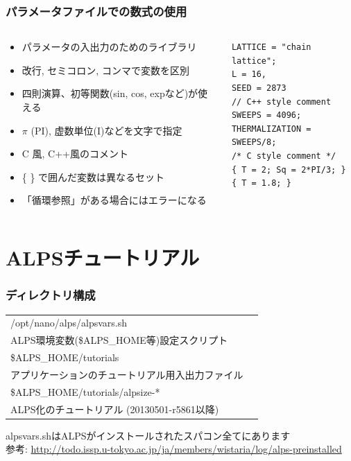 \begin{frame}[t,fragile]
  \frametitle{パラメータファイルでの数式の使用}
  \begin{columns}[T]
    \begin{column}{.5\textwidth}
      \begin{itemize}
      \item パラメータの入出力のためのライブラリ
        \item 改行, セミコロン, コンマで変数を区別
        \item 四則演算、初等関数(sin, cos, expなど)が使える
        \item $\pi$ (PI), 虚数単位(I)などを文字で指定
        \item C 風, C++風のコメント
        \item \{ \} で囲んだ変数は異なるセット
        \item 「循環参照」がある場合にはエラーになる
      \end{itemize}
    \end{column}
    \begin{column}{.5\textwidth}
    \begin{lstlisting}
LATTICE = "chain lattice";
L = 16,
SEED = 2873
// C++ style comment
SWEEPS = 4096;
THERMALIZATION = SWEEPS/8;
/* C style comment */
{ T = 2; Sq = 2*PI/3; }
{ T = 1.8; }
    \end{lstlisting}
    \end{column}
  \end{columns}
\end{frame}

\section{ALPSチュートリアル}

\begin{frame}
  \frametitle{ディレクトリ構成}
  \begin{tabular}{ll}
    /opt/nano/alps/alpsvars.sh & \\
    \hspace*{3em} ALPS環境変数(\$ALPS\_HOME等)設定スクリプト \\
    \$ALPS\_HOME/tutorials & \\
    \hspace*{3em} アプリケーションのチュートリアル用入出力ファイル \\
    \$ALPS\_HOME/tutorials/alpsize-* & \\
    \hspace*{3em} ALPS化のチュートリアル (20130501-r5861以降)
  \end{tabular}
  \begin{alertblock}{}
    alpsvars.shはALPSがインストールされたスパコン全てにあります \\
    参考: {\footnotesize \url{http://todo.issp.u-tokyo.ac.jp/ja/members/wistaria/log/alps-preinstalled}}
\end{alertblock}
\end{frame}

